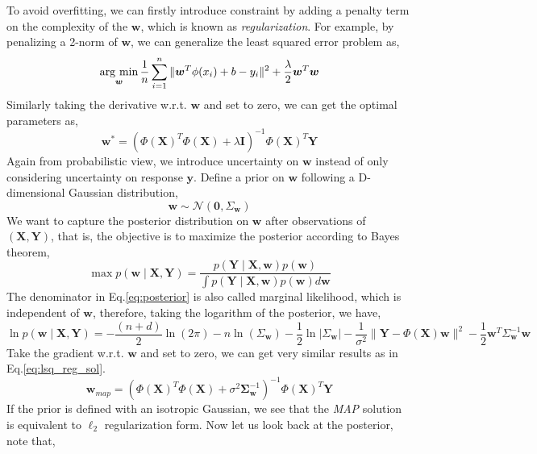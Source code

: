 \documentclass{article}
\newcommand{\vct}[1]{\ensuremath{\boldsymbol{#1}}} %
\newcommand{\set}[1]{\ensuremath{\mathcal{#1}}}
\newcommand{\argmin}{\operatornamewithlimits{\arg\,\min}}
\begin{document}
To avoid overfitting, we can firstly introduce constraint by adding a penalty term on the complexity of the $ \vct w $, which is known as \textit{regularization}. For example, by penalizing a 2-norm of $ \vct w $, we can generalize the least squared error problem as,
\begin{equation}
\argmin_{\vct w} \frac{1}{n}\sum_{i=1}^n \| \vct w^T \phi(x_i) + b - y_i\|^2 + \frac{\lambda}{2}\vct w^T\vct w 
\label{l2norm}
\end{equation}
Similarly taking the derivative w.r.t. $ \vct w $ and set to zero, we can get the optimal parameters as,
\begin{equation}
\vct w^* = \left( \Phi(\vct X)^T\Phi(\vct X) + \lambda \vct I \right)^{-1}\Phi(\vct X)^T\vct Y
\label{eq:lsq_reg_sol}
\end{equation}
Again from probabilistic view, we introduce uncertainty on $ \vct w $ instead of only considering uncertainty on response $ \vct y $. Define a prior on $ \vct w $ following a D-dimensional Gaussian distribution,
\[ \vct w \sim \set N\left( \vct 0, \Sigma_{\vct w} \right) \] 
We want to capture the posterior distribution on $ \vct w $ after observations of $ \left( \vct X, \vct Y \right) $, that is, the objective is to maximize the posterior according to Bayes theorem,
\begin{equation}
\max p\left( \vct w \mid \vct X, \vct Y \right) = \frac{p\left( \vct Y \mid \vct X, \vct w \right)p\left( \vct w \right)}{\int p\left( \vct Y \mid \vct X, \vct w \right)p\left( \vct w \right)d\vct w}
\label{eq:posterior}
\end{equation}
The denominator in Eq.\ref{eq:posterior} is also called marginal likelihood, which is independent of $ \vct w $, therefore, taking the logarithm of the posterior, we have,
\begin{equation}
\ln p\left( \vct w \mid \vct X, \vct Y \right) = -\frac{(n+d)}{2}\ln(2\pi)-n\ln(\Sigma_{\vct w}) - \frac{1}{2}\ln|\Sigma_{\vct w}|- \frac{1}{\sigma^2}\|\vct Y - \Phi(\vct X)\vct w\|^2 - \frac{1}{2}\vct w^T\Sigma_{\vct w}^{-1}\vct w 
\label{eq:ln_posterior}
\end{equation}
Take the gradient w.r.t. $ \vct w $ and set to zero, we can get very similar results as in Eq.\ref{eq:lsq_reg_sol}.
\begin{equation}
\vct w_{map} = \left( \Phi(\vct X)^T\Phi(\vct X) + \sigma^2\vct \Sigma_{\vct w}^{-1} \right)^{-1}\Phi(\vct X)^T\vct Y
\label{map_sol}
\end{equation}
If the prior is defined with an isotropic Gaussian, we see that the \textit{MAP} solution is equivalent to $ \ell_2 $ regularization form. Now let us look back at the posterior, note that,
\end{document}
